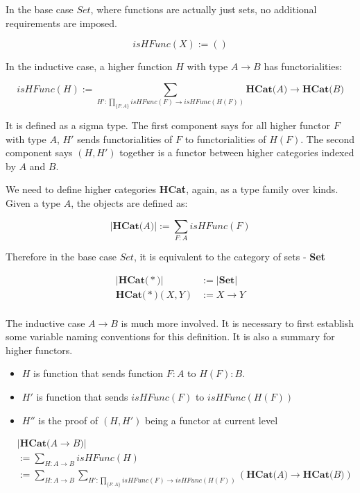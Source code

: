 In the base case $Set$, where functions are actually just sets, no additional requirements are imposed.

\[ isHFunc(X) := () \]

In the inductive case, a higher function $H$ with type $A \to B$ has functorialities:

\[ isHFunc(H) := \sum_{H' : \prod_{\{F : A\}} isHFunc(F) \to isHFunc(H(F))} \textbf{HCat(} A \textbf{)} \to \textbf{HCat(} B \textbf{)} \]

It is defined as a sigma type. The first component says for all higher functor $F$ with type $A$, $H'$ sends functorialities of $F$ to functorialities of $H(F)$. The second component says $(H , H')$ together is a functor between higher categories indexed by $A$ and $B$.

We need to define higher categories \textbf{HCat}, again, as a type family over kinds. Given a type $A$, the objects are defined as:

\[ \lvert\textbf{HCat(} A \textbf{)}\rvert := \sum_{F : A} isHFunc(F) \]

Therefore in the base case $Set$, it is equivalent to the category of sets - \textbf{Set}

\begin{align*}
\lvert\textbf{HCat(} * \textbf{)}\rvert &:= \lvert\textbf{Set}\rvert \\
\textbf{HCat(} * \textbf{)} (X , Y) &:= X \to Y \\
\end{align*}

The inductive case $A \to B$ is much more involved. It is necessary to first establish some variable naming conventions for this definition. It is also a summary for higher functors.

\begin{itemize}
  \item{$H$ is function that sends function $F : A$ to $H(F) : B$}.
  \item{$H'$ is function that sends $isHFunc(F)$ to $isHFunc(H(F))$}
  \item{$H''$ is the proof of $(H , H')$ being a functor at current level}
\end{itemize}

\begin{align*}
& \lvert\textbf{HCat(} A \to B \textbf{)}\rvert \\
&:= \sum_{H : A \to B} isHFunc(H) \\
&:= \sum_{H : A \to B} \sum_{H' : \prod_{\{F : A\}} isHFunc(F) \to isHFunc(H(F))} (\textbf{HCat(} A \textbf{)} \to \textbf{HCat(} B \textbf{)}) \\
\end{align*}

